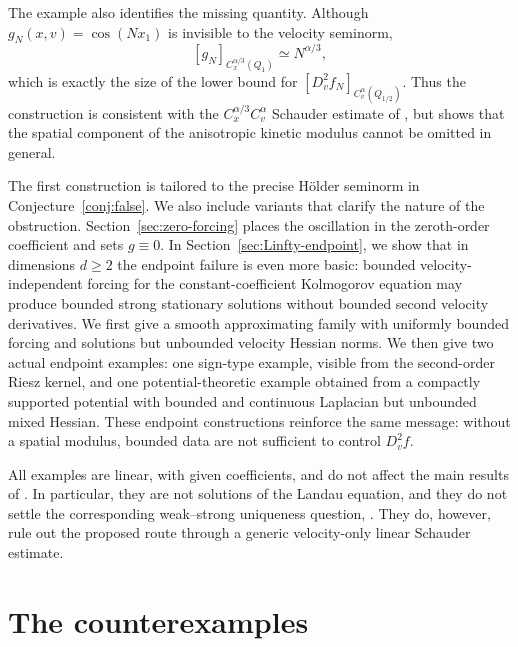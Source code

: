 \documentclass[11pt,reqno]{amsart}
\numberwithin{equation}{section}
\theoremstyle{remark}
\begin{document}
The example also identifies the missing quantity.  Although
\(g_N(x,v)=\cos(Nx_1)\) is invisible to the velocity seminorm,
\[
   [g_N]_{C_x^{\alpha/3}(Q_1)}\simeq N^{\alpha/3},
\]
which is exactly the size of the lower bound for
\([D_v^2f_N]_{C_v^\alpha(Q_{1/2})}\).  Thus the construction is
consistent with the \(C_x^{\alpha/3}C_v^\alpha\) Schauder estimate of
\cite{HW,DongYastrzhembskiySchauder}, but shows that the spatial component of the anisotropic
kinetic modulus cannot be omitted in general.

The first construction is tailored to the precise H\"older seminorm in
Conjecture~\ref{conj:false}.  We also include variants that clarify the
nature of the obstruction.  Section~\ref{sec:zero-forcing} places the
oscillation in the zeroth-order coefficient and sets \(g\equiv0\).  In
Section~\ref{sec:Linfty-endpoint}, we show that in dimensions \(d\ge2\) the
endpoint failure is even more basic: bounded velocity-independent forcing for
the constant-coefficient Kolmogorov equation may produce bounded %
{strong} stationary solutions without bounded second velocity derivatives.  We first give a smooth
approximating family with uniformly bounded forcing and solutions but
unbounded velocity Hessian norms.  We then give two actual endpoint examples:
one sign-type example, visible from the second-order Riesz kernel, and one
potential-theoretic example obtained from a compactly supported potential with
bounded {and continuous} Laplacian but unbounded mixed Hessian.  These endpoint constructions
reinforce the same message: without a spatial modulus, bounded data are not sufficient to
control \(D_v^2 f\).

All examples are linear, with %
{given} coefficients, and do not
affect the main results of \cite{HW}.  In particular, they are not solutions
of the Landau equation, and they do not settle the corresponding weak--strong
uniqueness question, \cite[Conjecture 1.4]{HW}.  They do, however, rule out
the proposed route through a generic velocity-only linear Schauder estimate.

\section{The counterexamples}
\end{document}
